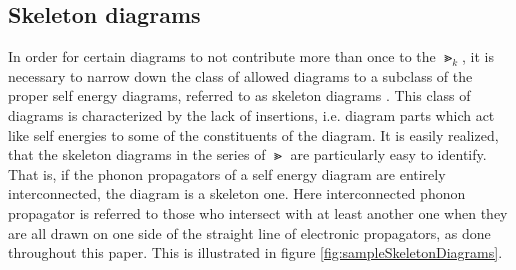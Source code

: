 \subsection{Skeleton diagrams}

In order for certain diagrams to not contribute more than once to the $ \Gt_k $, it is necessary to narrow down the class of allowed diagrams to a subclass of the proper self energy diagrams, referred to as skeleton diagrams \cite{mattuck2012guide}. This class of diagrams is characterized by the lack of insertions, i.e. diagram parts which act like self energies to some of the constituents of the diagram. It is easily realized, that the skeleton diagrams in the series of $ \Gt $ are particularly easy to identify. That is, if the phonon propagators of a self energy diagram are entirely interconnected, the diagram is a skeleton one. Here interconnected phonon propagator is referred to those who intersect with at least another one when they are all drawn on one side of the straight line of electronic propagators, as done throughout this paper. This is illustrated in figure \ref{fig:sampleSkeletonDiagrams}.
